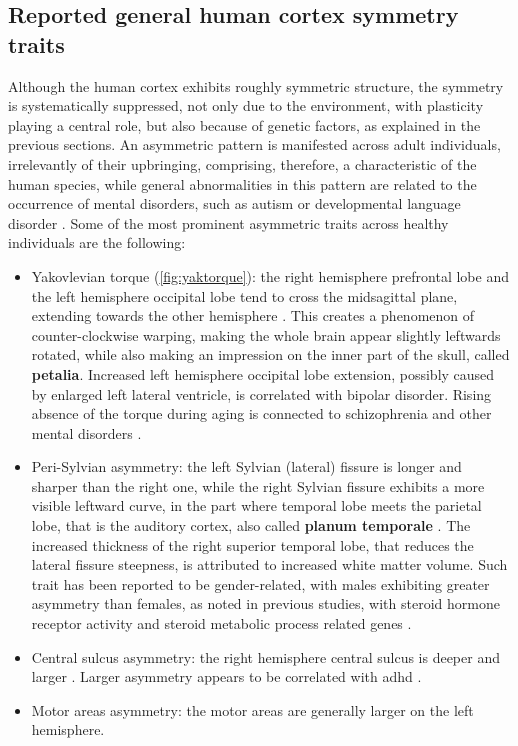 \subsection{Reported general human cortex symmetry traits}
\label{subsec:general_sym_traits}
Although the human cortex exhibits roughly symmetric structure, the symmetry is systematically suppressed, not only due to the environment, with plasticity playing a central role, but also because of genetic factors, as explained in the previous sections. An asymmetric pattern is manifested across adult individuals, irrelevantly of their upbringing, comprising, therefore, a characteristic of the human species, while general abnormalities in this pattern are related to the occurrence of mental disorders, such as autism or developmental language disorder \cite{Herbert2005,Kong2022}. Some of the most prominent asymmetric traits across healthy individuals are the following:
\begin{itemize}
	\item{Yakovlevian torque (\autoref{fig:yaktorque}): the right hemisphere prefrontal lobe and the left hemisphere occipital lobe tend to cross the midsagittal plane, extending towards the other hemisphere \cite{Kuo2022}. This creates a phenomenon of counter-clockwise warping, making the whole brain appear slightly leftwards rotated, while also making an impression on the inner part of the skull, called \textbf{petalia}. Increased left hemisphere occipital lobe extension, possibly caused by enlarged left lateral ventricle, is correlated with bipolar disorder\cite{Maller2015}. Rising absence of the torque during aging is connected to schizophrenia  and other mental disorders \cite{Ribolsi2014}.}
	\item{Peri-Sylvian asymmetry: the left Sylvian (lateral) fissure is longer and sharper than the right one, while the right Sylvian fissure exhibits a more visible leftward curve, in the part where temporal lobe meets the parietal lobe, that is the auditory cortex, also called \textbf{planum temporale} \cite{Kuo2022}. The increased thickness of the right superior temporal lobe, that reduces the lateral fissure steepness, is attributed to increased white matter volume. Such trait has been reported to be gender-related, with males exhibiting greater asymmetry than females, as noted in previous studies, with steroid hormone receptor activity and steroid metabolic process related genes \cite{Guadalupe2015}.}
	\item{Central sulcus asymmetry: the right hemisphere central sulcus is deeper and larger \cite{Kuo2022}. Larger asymmetry appears to be correlated with \ac{adhd} \cite{Li2015}.}
	\item{Motor areas asymmetry: the motor areas are generally larger on the left hemisphere.}
\end{itemize}

